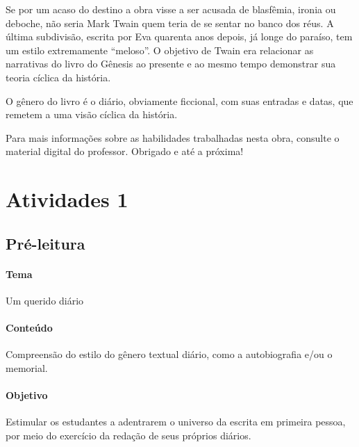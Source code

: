 \documentclass[12pt]{extarticle}
\begin{document}
Se por um acaso do destino a obra visse a ser acusada de blasfêmia, ironia ou deboche, 
não seria Mark Twain quem teria de se sentar no banco dos réus.
A última subdivisão, escrita por Eva quarenta anos depois, já longe do paraíso, 
tem um estilo extremamente “meloso”.
O objetivo de Twain era relacionar as narrativas do livro do Gênesis 
ao presente e ao mesmo tempo demonstrar sua teoria cíclica da história.

O gênero do livro é o diário, obviamente ficcional, 
com suas entradas e datas, que remetem a uma visão cíclica da história.




Para mais informações sobre as habilidades trabalhadas nesta obra, consulte o material digital do professor. Obrigado e até a próxima!


\section{Atividades 1}


\subsection{Pré-leitura}


\paragraph{Tema} Um querido diário

\paragraph{Conteúdo} Compreensão do estilo do gênero textual diário, como a autobiografia 
e/ou o memorial. 

\paragraph{Objetivo} Estimular os estudantes a adentrarem o universo da escrita em primeira
pessoa, por meio do exercício da redação de seus próprios diários.
\end{document}
